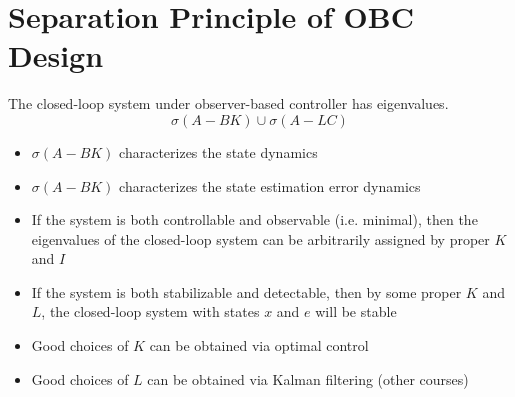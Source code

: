 \documentclass[10pt,a4paper,oneside]{article}
\begin{document}
\section{Separation Principle of OBC Design}
The closed-loop system under observer-based controller has eigenvalues.
\[
\sigma(A-B K) \cup \sigma(A-L C)
\]
\begin{itemize}
\item $\sigma(A-B K)$ characterizes the state dynamics
\item $\sigma(A-B K)$ characterizes the state estimation error dynamics
\item If the system is both controllable and observable (i.e. minimal), then the eigenvalues of the closed-loop system can be arbitrarily assigned by proper $K$ and $I$
\item If the system is both stabilizable and detectable, then by some proper $K$ and $L$, the closed-loop system with states $x$ and $e$ will be stable
\item Good choices of $K$ can be obtained via optimal control
\item Good choices of $L$ can be obtained via Kalman filtering (other courses)
\end{itemize}
\end{document}
